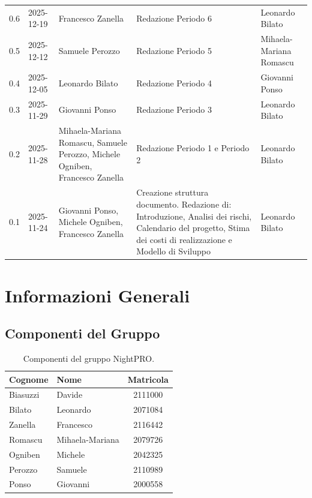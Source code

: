 \documentclass[a4paper, 11pt, oneside]{scrartcl} %
\begin{document}
{\begin{longtable}{@{}llp{}p{}p{}@{}}
0.6 & 2025-12-19 & Francesco Zanella & Redazione Periodo 6 & Leonardo Bilato \\
0.5 & 2025-12-12 & Samuele Perozzo & Redazione Periodo 5 & Mihaela-Mariana Romascu \\
0.4 & 2025-12-05 & Leonardo Bilato & Redazione Periodo 4 & Giovanni Ponso \\
0.3 & 2025-11-29 & Giovanni Ponso & Redazione Periodo 3 & Leonardo Bilato \\
0.2 & 2025-11-28 & Mihaela-Mariana Romascu, Samuele Perozzo, Michele Ogniben, Francesco Zanella & Redazione Periodo 1 e Periodo 2 & Leonardo Bilato \\
0.1 & 2025-11-24 & Giovanni Ponso, Michele Ogniben, Francesco Zanella & Creazione struttura documento. Redazione di: Introduzione, Analisi dei rischi, Calendario del progetto, Stima dei costi di realizzazione e Modello di Sviluppo & Leonardo Bilato \\
\end{longtable}
}
\newpage
\tableofcontents 
\pagestyle{fancy} 

\newpage
\section*{Informazioni Generali}

\subsection*{Componenti del Gruppo}

\begin{table}[h!]
\centering
\renewcommand{\arraystretch}{1.2} 
\begin{tabular}{@{}llc@{}}
\toprule
\textbf{Cognome} & \textbf{Nome} & \textbf{Matricola} \\
\midrule
Biasuzzi & Davide & 2111000 \\
Bilato & Leonardo & 2071084 \\
Zanella & Francesco & 2116442 \\
Romascu & Mihaela-Mariana & 2079726 \\
Ogniben & Michele & 2042325 \\
Perozzo & Samuele & 2110989 \\
Ponso & Giovanni & 2000558 \\
\bottomrule
\end{tabular}
\caption{Componenti del gruppo NightPRO.}
\label{tab_fig_componenti_del_gruppo_nightpro}
\end{table}
\end{document}
